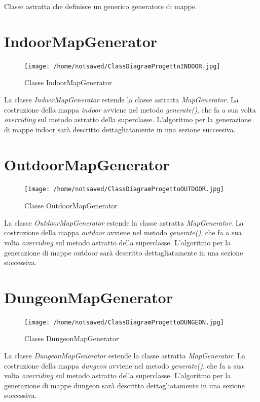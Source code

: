 \documentclass[11pt]{book}
\begin{document}
Classe astratta che definisce un generico generatore di mappe.

\section{IndoorMapGenerator}

\begin{figure}[H]
\centering
\texttt{[image: /home/notsaved/ClassDiagramProgettoINDOOR.jpg]}
\caption{Classe IndoorMapGenerator}
\label{Classe IndoorMapGenerator}
\end{figure}

La classe \emph{IndoorMapGenerator} estende la classe astratta \emph{MapGenerator}. La costruzione della mappa \emph{indoor} avviene nel metodo \emph{generate()}, che fa a sua volta \emph{overriding} sul metodo astratto della superclasse. L'algoritmo per la generazione di mappe indoor sar\`a descritto dettagliatamente in una sezione successiva. 

\section{OutdoorMapGenerator}

\begin{figure}[H]
\centering
\texttt{[image: /home/notsaved/ClassDiagramProgettoOUTDOOR.jpg]}
\caption{Classe OutdoorMapGenerator}
\label{classoutdoorgenerator}
\end{figure}

La classe \emph{OutdoorMapGenerator} estende la classe astratta \emph{MapGenerator}. La costruzione della mappa \emph{outdoor} avviene nel metodo \emph{generate()}, che fa a sua volta \emph{overriding} sul metodo astratto della superclasse. L'algoritmo per la generazione di mappe outdoor sar\`a descritto dettagliatamente in una sezione successiva. 

\section{DungeonMapGenerator}

\begin{figure}[H]
\centering
\texttt{[image: /home/notsaved/ClassDiagramProgettoDUNGEON.jpg]}
\caption{Classe DungeonMapGenerator}
\label{classdungeonmap}
\end{figure}

La classe \emph{DungeonMapGenerator} estende la classe astratta \emph{MapGenerator}. La costruzione della mappa \emph{dungeon} avviene nel metodo \emph{generate()}, che fa a sua volta \emph{overriding} sul metodo astratto della superclasse. L'algoritmo per la generazione di mappe dungeon sar\`a descritto dettagliatamente in una sezione successiva. 
\end{document}
